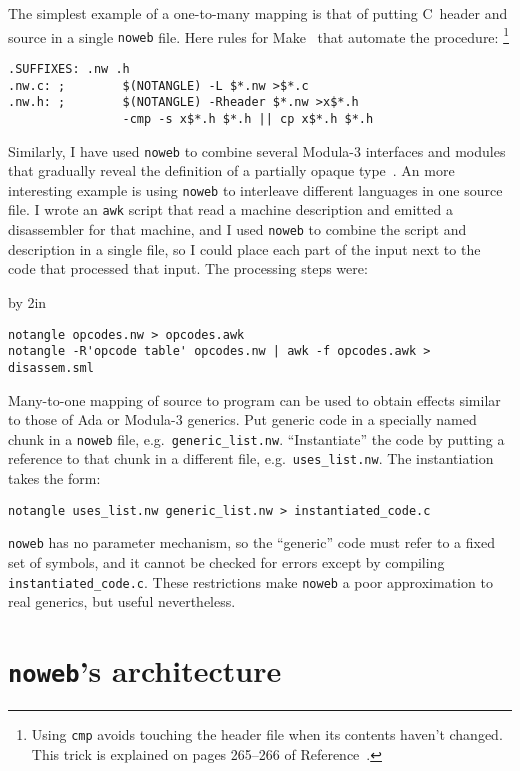 \clearpage %
The simplest example of a one-to-many mapping is that of putting
C~header and source in a single {\tt noweb} file.
Here rules for Make~\cite{feldman:make} that automate the
procedure:%
\footnote{Using \verb+cmp+ avoids touching the header file when its contents
haven't changed.
This trick is explained on pages 265--266 of Reference~\cite{kernighan:unix}.}
\begin{verbatim}
.SUFFIXES: .nw .h
.nw.c: ;        $(NOTANGLE) -L $*.nw >$*.c
.nw.h: ;        $(NOTANGLE) -Rheader $*.nw >x$*.h
                -cmp -s x$*.h $*.h || cp x$*.h $*.h
\end{verbatim}
Similarly,
I have used {\tt noweb} to combine several Modula-3 interfaces and
modules that
gradually reveal the definition of a partially opaque
type~\cite[Chapter~6]{nelson:systems}. 
An more interesting example is using {\tt noweb} to
interleave different languages in one source file. 
I wrote an \verb+awk+
script that read a machine description and emitted a disassembler for
that machine, and I used {\tt noweb} to combine the script and description
in a single file, so I could place each part of the input next to the
code that processed that input. 
The processing steps were:
{\par\advance\hsize by 2in %
\begin{verbatim}
notangle opcodes.nw > opcodes.awk
notangle -R'opcode table' opcodes.nw | awk -f opcodes.awk > disassem.sml
\end{verbatim}
}

Many-to-one mapping of source to program can be used to obtain
effects similar to those of Ada or Modula-3 generics.
Put 
generic code in a specially named chunk in a \verb+noweb+
file, e.g.~\verb+generic_list.nw+.
``Instantiate'' the code by putting a reference to that chunk in a
different file, e.g.~\verb|uses_list.nw|.
The instantiation takes the form:
\begin{verbatim}
notangle uses_list.nw generic_list.nw > instantiated_code.c
\end{verbatim} 
{\tt noweb} has no parameter mechanism, so the ``generic'' code must
refer to a fixed set of symbols, and it cannot be checked for errors
except by compiling \verb+instantiated_code.c+.
These restrictions make {\tt noweb} a poor approximation to real
generics, but useful nevertheless.


\section{{\tt noweb}'s architecture}

